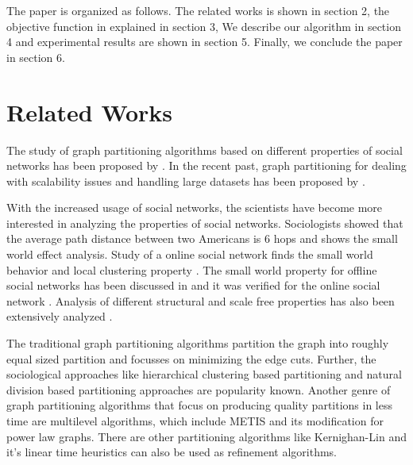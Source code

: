 \documentclass[letterpaper]{article}
\begin{document}
The paper is organized as follows. The related works is shown in section 2, the
objective function in explained in section 3, We describe our algorithm  in
section 4 and  experimental results are shown in section 5.  Finally, we
conclude the paper in section 6.

\section{Related Works}
  The study of graph partitioning algorithms based on different properties of
social networks has been proposed by \cite{arxviv}. In the recent past, graph
partitioning for dealing with scalability issues and handling large datasets
has been proposed by \cite{5,6}.

    With the increased usage of social networks, the scientists have become
more interested in analyzing the properties of social networks.  Sociologists
showed that the average path distance between two Americans is 6 hops \cite{4}
and \cite{8} shows the small world effect analysis.  Study of a online social
network  finds the small world behavior and local clustering property
\cite{9}.  The small world property for offline social networks has been
discussed in \cite{9,10,11} and it was verified for the online social network
\cite{12,13}. Analysis of different structural and scale free properties has
also been extensively analyzed \cite{12}.



    The traditional graph partitioning algorithms\cite{16,17,18} partition the
graph into roughly equal sized partition  and focusses on minimizing the edge
cuts.  Further, the sociological approaches like hierarchical clustering based
partitioning and natural division based partitioning approaches are popularity
known\cite{19}. Another genre of graph partitioning algorithms that focus on
producing quality partitions in less time are multilevel algorithms, which
include METIS\cite{20} and its modification for power law graphs\cite{21}.
There are other partitioning algorithms like Kernighan-Lin\cite{22} and it's
linear time heuristics\cite{23} can also be used as refinement algorithms.
\end{document}
